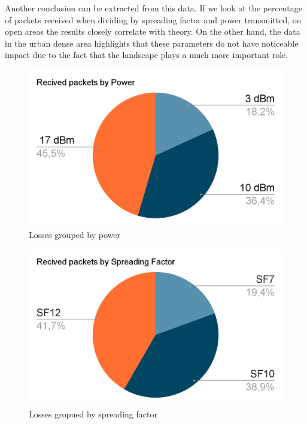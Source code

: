 Another conclusion can be extracted from this data. If we look at the percentage of packets received when dividing by spreading factor and power
transmitted, on open areas the results closely correlate with theory. On the other hand, the data in the urban dense area highlights that 
these parameters do not have noticeable impact due to the fact that the landscape plays a much more important role.
\\
\begin{figure}[htpb]
\centering    
\includegraphics[width=\linewidth]{recivedByPower.png}
\caption{Losses grouped by power}
\label{conc:recivedPow}
\end{figure}
\begin{figure}[htpb]
\includegraphics[width=\linewidth]{recivedBySpreading.png}
\caption{Losses gropued by spreading factor}
\label{conc:recivedSp}
\end{figure}
